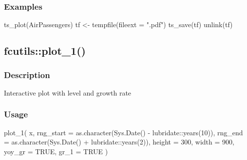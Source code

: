 \documentclass[
  letterpaper,
  DIV=11,
  numbers=noendperiod]{scrreport}
\newenvironment{Shaded}{\begin{snugshade}}{\end{snugshade}}
\newcommand{\AttributeTok}[1]{\textcolor[rgb]{0.40,0.45,0.13}{#1}}
\newcommand{\ConstantTok}[1]{\textcolor[rgb]{0.56,0.35,0.01}{#1}}
\newcommand{\DecValTok}[1]{\textcolor[rgb]{0.68,0.00,0.00}{#1}}
\newcommand{\FunctionTok}[1]{\textcolor[rgb]{0.28,0.35,0.67}{#1}}
\newcommand{\NormalTok}[1]{\textcolor[rgb]{0.00,0.23,0.31}{#1}}
\newcommand{\OtherTok}[1]{\textcolor[rgb]{0.00,0.23,0.31}{#1}}
\newcommand{\SpecialCharTok}[1]{\textcolor[rgb]{0.37,0.37,0.37}{#1}}
\newcommand{\StringTok}[1]{\textcolor[rgb]{0.13,0.47,0.30}{#1}}
\begin{document}
\subsubsection{Examples}\label{examples-62}

\begin{Shaded}
\begin{Highlighting}[]
\FunctionTok{ts\_plot}\NormalTok{(AirPassengers)}
\NormalTok{tf }\OtherTok{\textless{}{-}} \FunctionTok{tempfile}\NormalTok{(}\AttributeTok{fileext =} \StringTok{".pdf"}\NormalTok{)}
\FunctionTok{ts\_save}\NormalTok{(tf)}
\FunctionTok{unlink}\NormalTok{(tf)}
\end{Highlighting}
\end{Shaded}

\subsection{fcutils::plot\_1()}\label{fcutilsplot_1}

\subsubsection{Description}\label{description-63}

Interactive plot with level and growth rate

\subsubsection{Usage}\label{usage-63}

\begin{Shaded}
\begin{Highlighting}[]
\FunctionTok{plot\_1}\NormalTok{(}
\NormalTok{  x,}
  \AttributeTok{rng\_start =} \FunctionTok{as.character}\NormalTok{(}\FunctionTok{Sys.Date}\NormalTok{() }\SpecialCharTok{{-}}\NormalTok{ lubridate}\SpecialCharTok{::}\FunctionTok{years}\NormalTok{(}\DecValTok{10}\NormalTok{)),}
  \AttributeTok{rng\_end =} \FunctionTok{as.character}\NormalTok{(}\FunctionTok{Sys.Date}\NormalTok{() }\SpecialCharTok{+}\NormalTok{ lubridate}\SpecialCharTok{::}\FunctionTok{years}\NormalTok{(}\DecValTok{2}\NormalTok{)),}
  \AttributeTok{height =} \DecValTok{300}\NormalTok{,}
  \AttributeTok{width =} \DecValTok{900}\NormalTok{,}
  \AttributeTok{yoy\_gr =} \ConstantTok{TRUE}\NormalTok{,}
  \AttributeTok{gr\_1 =} \ConstantTok{TRUE}
\NormalTok{)}
\end{Highlighting}
\end{Shaded}
\end{document}
